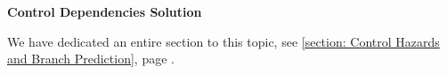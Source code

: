 \highspace
\begin{flushleft}
    \textcolor{Green3}{ \textbf{Control Dependencies Solution}}
\end{flushleft}
We have dedicated an entire section to this topic, see \ref{section: Control Hazards and Branch Prediction}, page \pageref{section: Control Hazards and Branch Prediction}.